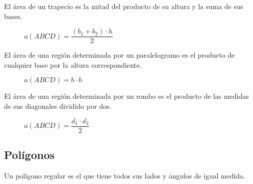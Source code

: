 \begin{theorem}
    El área de un trapecio es la mitad del producto de su altura y la suma de sus bases.

    \begin{figure}[!h]
        \centering
        
        \caption{$a(ABCD) = \dfrac{(b_1 + b_2) \cdot h}{2}$}
        \label{fig:area-trapezoid}
    \end{figure}
    
\end{theorem}

\clearpage

\begin{theorem}
    El área de una región determinada por un paralelogramo es el producto de cualquier base por la altura correspondiente.    

    \begin{figure}[!h]
        \centering
        
        \caption{$a(ABCD) = b \cdot h$}
        \label{fig:area-paralelogramo}
    \end{figure}
    
\end{theorem}

\begin{theorem}
    El área de una región determinada por un rombo es el producto de las medidas de sus diagonales dividido por dos.

    \begin{figure}[!h]
        \centering
        
        \caption{$a(ABCD) = \dfrac{d_1 \cdot d_2}{2}$}
        \label{fig:area-rombus}
    \end{figure}    
\end{theorem}

\clearpage

\subsection{Polígonos}

\begin{definition}
    Un polígono regular es el que tiene todos sus lados y ángulos de igual medida.
\end{definition}

